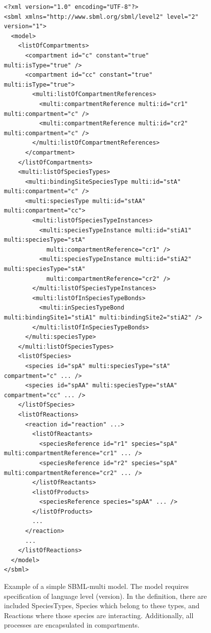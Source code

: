 \documentclass[12pt]{fithesis2}
\begin{document}
\begin{figure}[!h]
\lstset{language=XML}
\begin{lstlisting}[basicstyle=\scriptsize, frame=single]
<?xml version="1.0" encoding="UTF-8"?>
<sbml xmlns="http://www.sbml.org/sbml/level2" level="2" version="1">
  <model>
    <listOfCompartments>
      <compartment id="c" constant="true" multi:isType="true" />
      <compartment id="cc" constant="true" multi:isType="true">
        <multi:listOfCompartmentReferences>
          <multi:compartmentReference multi:id="cr1" multi:compartment="c" />
          <multi:compartmentReference multi:id="cr2" multi:compartment="c" />
        </multi:listOfCompartmentReferences>
      </compartment>
    </listOfCompartments>
    <multi:listOfSpeciesTypes>
      <multi:bindingSiteSpeciesType multi:id="stA" multi:compartment="c" />
      <multi:speciesType multi:id="stAA" multi:compartment="cc">
        <multi:listOfSpeciesTypeInstances>
          <multi:speciesTypeInstance multi:id="stiA1" multi:speciesType="stA"
            multi:compartmentReference="cr1" />
          <multi:speciesTypeInstance multi:id="stiA2" multi:speciesType="stA"
            multi:compartmentReference="cr2" />
        </multi:listOfSpeciesTypeInstances>
        <multi:listOfInSpeciesTypeBonds>
          <multi:inSpeciesTypeBond multi:bindingSite1="stiA1" multi:bindingSite2="stiA2" />
        </multi:listOfInSpeciesTypeBonds>
      </multi:speciesType>
    </multi:listOfSpeciesTypes>
    <listOfSpecies>
      <species id="spA" multi:speciesType="stA" compartment="c" ... />
      <species id="spAA" multi:speciesType="stAA" compartment="cc" ... />
    </listOfSpecies>
    <listOfReactions>
      <reaction id="reaction" ...>
        <listOfReactants>
          <speciesReference id="r1" species="spA" multi:compartmentReference="cr1" ... />
          <speciesReference id="r2" species="spA" multi:compartmentReference="cr2" ... />
        </listOfReactants>
        <listOfProducts>
          <speciesReference species="spAA" ... />
        </listOfProducts>
        ...
      </reaction>
      ...
    </listOfReactions>
  </model>
</sbml>
\end{lstlisting}
\caption{Example of a simple SBML-multi model. The model requires specification of language level (version). In the definition, there are included SpeciesTypes, Species which belong to these types, and Reactions where those species are interacting. Additionally, all processes are encapsulated in compartments.}\label{SBML_example}
\end{figure}
\end{document}
